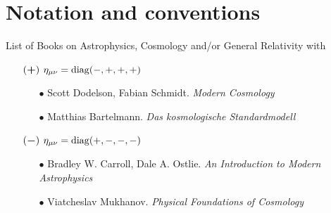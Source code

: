 \chapter*{Notation and conventions}
\thispagestyle{empty}

List of Books on Astrophysics, Cosmology and/or General Relativity with

\begin{itemize}
    \item[$(\boldsymbol{+})$] $\eta_{\mu \nu} = \operatorname{diag}(-,+,+,+)$
    \begin{itemize}
        \item[$\bullet$] Scott Dodelson, Fabian Schmidt. \textit{Modern Cosmology}
        \item[$\bullet$] Matthias Bartelmann. \textit{Das kosmologische Standardmodell}
    \end{itemize}
    \item[$(\boldsymbol{-})$] $\eta_{\mu \nu} = \operatorname{diag}(+,-,-,-)$
    \begin{itemize}
        \item[$\bullet$] Bradley W. Carroll, Dale A. Ostlie. \textit{An Introduction to Modern Astrophysics}
        \item[$\bullet$] Viatcheslav Mukhanov. \textit{Physical Foundations of Cosmology}
    \end{itemize}
\end{itemize}





